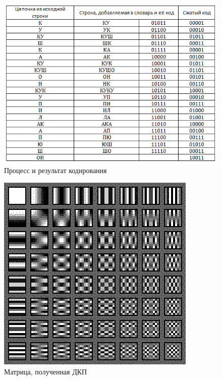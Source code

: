 \begin{figure}[H]
	\begin{center}
		\includegraphics[scale=1]{../pics/LZW/result.png}
		\caption{Процесс и результат кодирования}
		\label{pic:lzw:result}
	\end{center}
\end{figure}
\begin{figure}[H]
	\begin{center}
		\includegraphics[scale=1]{../pics/cosine_transform/matrix.png}
		\caption{Матрица, полученная ДКП}
		\label{pic:cosine_tranform:matrix}
	\end{center}
\end{figure}



